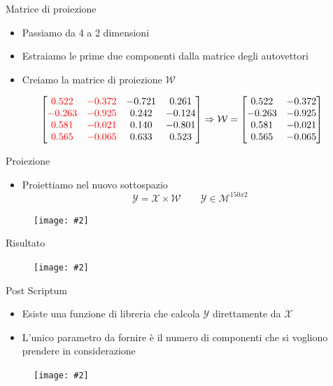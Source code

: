 \documentclass[xcolor={dvipsnames}]{beamer}
\newcommand{\codice}[2]{}
\newcommand{\figcen}[2]{
	\begin{figure}
		\begin{center}
			\texttt{[image: \#2]}
		\end{center}
	\end{figure}
}
\begin{document}
		\begin{frame}{Matrice di proiezione}
			\begin{itemize}
				\item Passiamo da 4 a 2 dimensioni
				\item Estraiamo le prime due componenti dalla matrice degli autovettori
			\end{itemize}
			\codice{125}{127}
			\begin{itemize}
				\item Creiamo la matrice di proiezione $\mathcal{W}$
			\end{itemize}
			$$\begin{bmatrix}
			\textcolor{red}{0.522} & \textcolor{red}{-0.372} & -0.721 & 0.261\\
			\textcolor{red}{-0.263} & \textcolor{red}{-0.925} & 0.242 & -0.124\\
			\textcolor{red}{0.581} & \textcolor{red}{-0.021} & 0.140 & -0.801\\
			\textcolor{red}{0.565} & \textcolor{red}{-0.065} & 0.633 & 0.523\\
			\end{bmatrix} \Rightarrow
			\mathcal{W} = \begin{bmatrix}
			0.522 & -0.372\\
			-0.263 & -0.925\\
			0.581 & -0.021\\
			0.565 & -0.065\\
			\end{bmatrix}$$
		\end{frame}

		\begin{frame}{Proiezione}
			\begin{itemize}
				\item Proiettiamo nel nuovo sottospazio $$\mathcal{Y} = \mathcal{X}\times \mathcal{W} \qquad \mathcal{Y} \in \mathcal{M}^{150x2}$$
			\end{itemize}
			\codice{132}{133} \pause
			\figcen{.5\textwidth}{dubbio}
		\end{frame}
		
		\begin{frame}{Risultato}
			\figcen{.8\textwidth}{PCA}
		\end{frame}
		
		\begin{frame}{Post Scriptum}
			\begin{itemize}
				\item Esiste una funzione di libreria che calcola $\mathcal{Y}$ direttamente da $\mathcal{X}$
				\item L'unico parametro da fornire è il numero di componenti che si vogliono prendere in considerazione
			\end{itemize}
			\codice{149}{151}
			\figcen{.3\textwidth}{ok}
		\end{frame}
\end{document}

